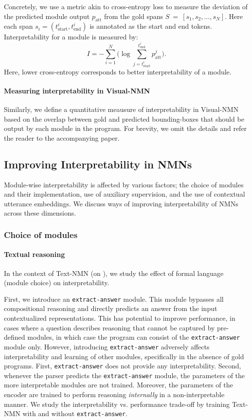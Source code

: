 \documentclass[main.tex]{subfiles}
\begin{document}
Concretely, we use a metric akin to cross-entropy loss to measure the deviation of the predicted module output $p_{\text{att}}$ from the gold spans  $S~=~[s_{1}, s_{2}, \ldots, s_{N}]$. Here each span $s_{i} = (t^{i}_{\text{start}}, t^{i}_{\text{end}})$ is annotated as the start and end tokens.
Interpretability for a module is measured by:
\begin{equation*}
    I = - \sum_{i=1}^{N}  \Bigg(\log \sum_{j = t^{i}_{\text{start}}}^{t^{i}_{\text{end}}} p_{\text{att}}^{j} \Bigg).
\end{equation*}
Here, lower cross-entropy corresponds to better interpretability of a module.

\paragraph{Measuring interpretability in Visual-NMN}
Similarly, we define a quantitative meausure of interpretability in Visual-NMN based on the overlap between gold and predicted bounding-boxes that should be output by each module in the program. For brevity, we omit the details and refer the reader to the accompanying paper.


\subsection{Improving Interpretability in NMNs}
\label{ssec:interpret}
Module-wise interpretability is affected by various factors; the choice of modules and their implementation, use of auxiliary supervision, and the use of contextual utterance embeddings. We discuss ways of improving interpretability of NMNs across these dimensions.

\subsubsection{Choice of modules}
\paragraph{Textual reasoning}
In the context of Text-NMN (on \drop{}), we study the effect of formal language (module choice) on interpretability.

First, we introduce an \texttt{extract-answer} module. This module bypasses all compositional reasoning and directly predicts an answer from the input contextualized representations. This has potential to improve performance, in cases where a question describes reasoning that cannot be captured by pre-defined modules, in which case the program can consist of the \texttt{extract-answer} module only.
However, introducing \texttt{extract-answer} adversely affects interpretability and learning of other modules, specifically in the absence of gold programs. First, \texttt{extract-answer} does not provide any interpretability. Second, whenever the parser predicts the \texttt{extract-answer} module, the parameters of the more interpretable modules are not trained. Moreover, the parameters of the encoder are trained to perform reasoning \emph{internally} in a non-interpretable manner. We study the interpretability vs. performance trade-off by training Text-NMN with and without \texttt{extract-answer}.
\end{document}
